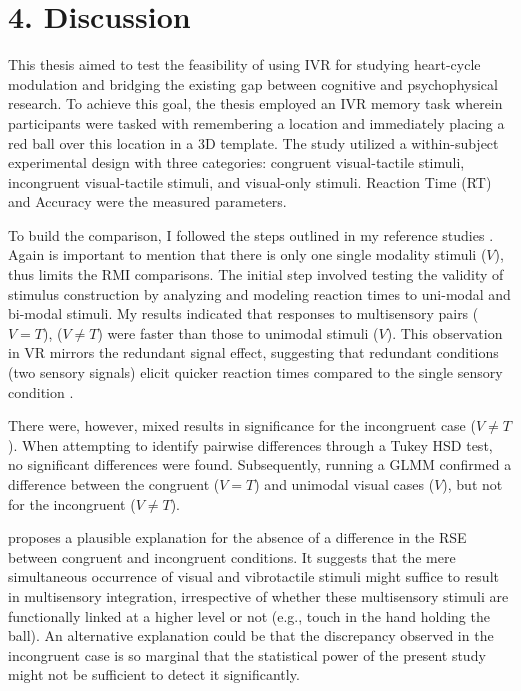 \documentclass[12pt,oneside,openright]{report}
\begin{document}
    

\pagebreak
\section*{4. Discussion}

This thesis aimed to test the feasibility of using IVR for studying heart-cycle modulation and bridging the existing gap between cognitive and psychophysical research. To achieve this goal, the thesis employed an IVR memory task wherein participants were tasked with remembering a location and immediately placing a red ball over this location in a 3D template. The study utilized a within-subject experimental design with three categories: congruent visual-tactile stimuli, incongruent visual-tactile stimuli, and visual-only stimuli. Reaction Time (RT) and Accuracy were the measured parameters.

To build the comparison, I followed the steps outlined in my reference studies \parencite{Innes2019ACA, SALTAFOSSI2023108642, Ulrich2007}. Again is important to mention that there is only one single modality stimuli ($V$), thus limits the RMI comparisons. The initial step involved testing the validity of stimulus construction by analyzing and modeling reaction times to uni-modal and bi-modal stimuli. My results indicated that responses to multisensory pairs ($V=T$), ($V \neq T$) were faster than those to unimodal stimuli ($V$). This observation in VR mirrors the redundant signal effect, suggesting that redundant conditions (two sensory signals) elicit quicker reaction times compared to the single sensory condition \parencite*{SALTAFOSSI2023108642}.

There were, however, mixed results in significance for the incongruent case ($V \neq T$). When attempting to identify pairwise differences through a Tukey HSD test, no significant differences were found. Subsequently, running a GLMM confirmed a difference between the congruent ($V=T$) and unimodal visual cases ($V$), but not for the incongruent ($V \neq T$).

\Cite{RSE_FBI} proposes a plausible explanation for the absence of a difference in the RSE between congruent and incongruent conditions. It suggests that the mere simultaneous occurrence of visual and vibrotactile stimuli might suffice to result in multisensory integration, irrespective of whether these multisensory stimuli are functionally linked at a higher level or not (e.g., touch in the hand holding the ball). An alternative explanation could be that the discrepancy observed in the incongruent case is so marginal that the statistical power of the present study might not be sufficient to detect it significantly.
\end{document}
